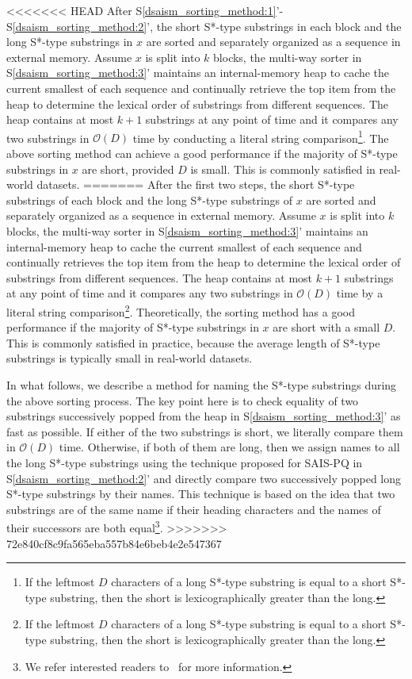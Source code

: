 \documentclass[10pt,journal,compsoc]{IEEEtran}
\begin{document}
<<<<<<< HEAD
After S\ref{dsaism_sorting_method:1}'-S\ref{dsaism_sorting_method:2}', the short S*-type substrings in each block and the long S*-type substrings in $x$ are sorted and separately organized as a sequence in external memory. Assume $x$ is split into $k$ blocks, the multi-way sorter in S\ref{dsaism_sorting_method:3}' maintains an internal-memory heap to cache the current smallest of each sequence and continually retrieve the top item from the heap to determine the lexical order of substrings from different sequences. The heap contains at most $k + 1$ substrings at any point of time and it compares any two substrings in $\mathcal{O}(D)$ time by conducting a literal string comparison\footnote{If the leftmost $D$ characters of a long S*-type substring is equal to a short S*-type substring, then the short is lexicographically greater than the long.}. The above sorting method can achieve a good performance if the majority of S*-type substrings in $x$ are short, provided $D$ is small. This is commonly satisfied in real-world datasets.
=======
After the first two steps, the short S*-type substrings of each block and the long S*-type substrings of $x$ are sorted and separately organized as a sequence in external memory. Assume $x$ is split into $k$ blocks, the multi-way sorter in S\ref{dsaism_sorting_method:3}' maintains an internal-memory heap to cache the current smallest of each sequence and continually retrieves the top item from the heap to determine the lexical order of substrings from different sequences. The heap contains at most $k + 1$ substrings at any point of time and it compares any two substrings in $\mathcal{O}(D)$ time by a literal string comparison\footnote{If the leftmost $D$ characters of a long S*-type substring is equal to a short S*-type substring, then the short is lexicographically greater than the long.}. Theoretically, the sorting method has a good performance if the majority of S*-type substrings in $x$ are short with a small $D$. This is commonly satisfied in practice, because the average length of S*-type substrings is typically small in real-world datasets.

In what follows, we describe a method for naming the S*-type substrings during the above sorting process. The key point here is to check equality of two substrings successively popped from the heap in S\ref{dsaism_sorting_method:3}' as fast as possible. If either of the two substrings is short, we literally compare them in $\mathcal{O}(D)$ time. Otherwise, if both of them are long, then we assign names to all the long S*-type substrings using the technique proposed for SAIS-PQ in S\ref{dsaism_sorting_method:2}' and directly compare two successively popped long S*-type substrings by their names. This technique is based on the idea that two substrings are of the same name if their heading characters and the names of their successors are both equal\footnote{We refer interested readers to~\cite{Liu15} for more information.}.
>>>>>>> 72e840cf8c9fa565eba557b84e6beb4e2e547367
\end{document}
